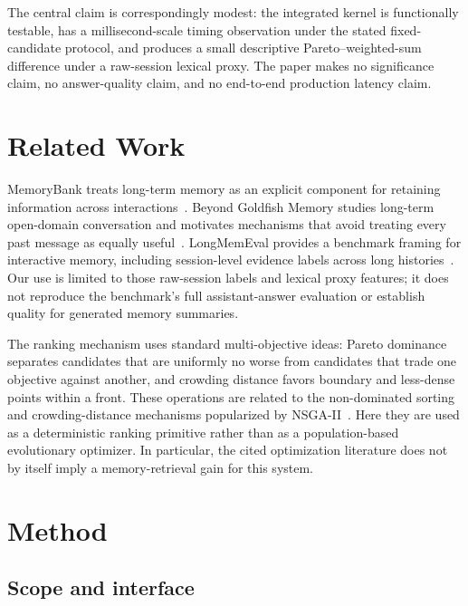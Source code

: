 \documentclass[review,12pt]{elsarticle}
\begin{document}
The central claim is correspondingly modest: the integrated kernel is functionally testable, has a millisecond-scale timing observation under the stated fixed-candidate protocol, and produces a small descriptive Pareto--weighted-sum difference under a raw-session lexical proxy. The paper makes no significance claim, no answer-quality claim, and no end-to-end production latency claim.

\section{Related Work}
\label{sec:related}

MemoryBank treats long-term memory as an explicit component for retaining information across interactions~\cite{zhong2023memorybank}. Beyond Goldfish Memory studies long-term open-domain conversation and motivates mechanisms that avoid treating every past message as equally useful~\cite{xu2022goldfish}. LongMemEval provides a benchmark framing for interactive memory, including session-level evidence labels across long histories~\cite{wu2024longmemeval}. Our use is limited to those raw-session labels and lexical proxy features; it does not reproduce the benchmark's full assistant-answer evaluation or establish quality for generated memory summaries.

The ranking mechanism uses standard multi-objective ideas: Pareto dominance separates candidates that are uniformly no worse from candidates that trade one objective against another, and crowding distance favors boundary and less-dense points within a front. These operations are related to the non-dominated sorting and crowding-distance mechanisms popularized by NSGA-II~\cite{deb2002nsga2}. Here they are used as a deterministic ranking primitive rather than as a population-based evolutionary optimizer. In particular, the cited optimization literature does not by itself imply a memory-retrieval gain for this system.

\section{Method}
\label{sec:method}

\subsection{Scope and interface}
\end{document}

